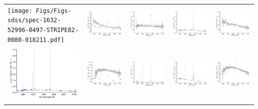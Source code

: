 \begin{center}
\begin{longtable}{l l l l l }
    \texttt{[image: Figs/Figs-sdss/spec-1632-52996-0497-STRIPE82-0080-018211.pdf]} & \includegraphics[width=0.19\linewidth, clip]{Figs/Figs-sdss/spec-1827-53531-0289-SPLUS-n05n50-033851.pdf} & \includegraphics[width=0.19\linewidth, clip]{Figs/Figs-sdss/spec-1829-53494-0276-SPLUS-n05n53-037456.pdf} & \includegraphics[width=0.19\linewidth, clip]{Figs/Figs-sdss/spec-1829-53494-0282-SPLUS-n05n53-005761.pdf} & \includegraphics[width=0.19\linewidth, clip]{Figs/Figs-sdss/spec-1901-53261-0086-SPLUS-s02s13-032892.pdf} \\
    \includegraphics[width=0.19\linewidth, clip]{Figs/Figs-sdss/spec-1919-53240-0073-STRIPE82-0111-068928.pdf} & \includegraphics[width=0.19\linewidth, clip]{Figs/Figs-sdss/spec-1919-53240-0621-STRIPE82-0112-020655.pdf} & \includegraphics[width=0.19\linewidth, clip]{Figs/Figs-sdss/spec-2568-54153-0481-SPLUS-n01s27-050095.pdf} & \includegraphics[width=0.19\linewidth, clip]{Figs/Figs-sdss/spec-2636-54082-0584-STRIPE82-0054-038222.pdf} & \includegraphics[width=0.19\linewidth, clip]{Figs/Figs-sdss/spec-2892-54552-0550-SPLUS-n01s24-037959.pdf} \\

\end{longtable}
\end{center}
